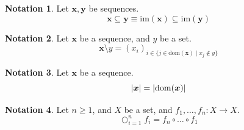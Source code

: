 \documentclass[10pt]{article}
\theoremstyle{definition}
\newtheorem{notation}{Notation}
\theoremstyle{remark}
\newcommand{\dom}{\mathrm{dom}}
\newcommand{\im}{\mathrm{im}}
\begin{document}
\begin{notation}
Let $\bm{x},\bm{y}$ be sequences.
$$
	\bm{x}\bm{\subseteq}\bm{y}
	\equiv
	\im(\bm{x})\subseteq\im(\bm{y})
$$
\end{notation}

\begin{notation}
Let $\bm{x}$ be a sequence, and $y$ be a set.
$$
	\bm{x}\bm{\setminus}y
	=
	(x_{i})_{i\in\{j\in\dom(\bm{x})\mid x_{j}\not\in y\}}
$$
\end{notation}

\begin{notation}
Let $\bm{x}$ be a sequence.
$$
	\abs{\bm{x}}
	=
	\abs{\dom(\bm{x})}
$$
\end{notation}

\begin{notation}
Let $n\geq 1$, and $X$ be a set, and $f_{1},\dots,f_{n}:X\to X$.
$$
	\bigcirc_{i=1}^{n}f_{i}
	=
	f_{n}\circ\dots\circ f_{1}
$$
\end{notation}
\end{document}
